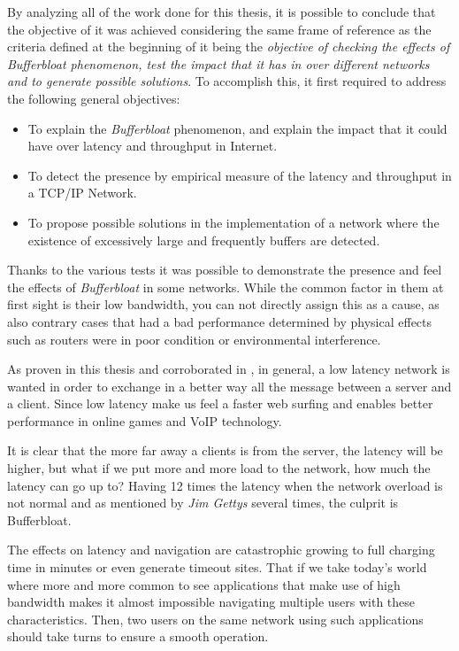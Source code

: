 By analyzing all of the work done for this thesis, it is possible to conclude
that the objective of it was achieved considering the same frame of reference
as the criteria defined at the beginning of it being the \emph{objective of
checking the effects of Bufferbloat phenomenon, test the impact that it has in
over different networks and to generate possible solutions}. To accomplish
this, it first required to address the following general objectives:

\begin{itemize}
	\item To explain the \emph{Bufferbloat} phenomenon, and explain the impact that it could have over latency and throughput in Internet.
	\item To detect the presence by empirical measure of the latency and throughput in a TCP/IP Network.
	\item To propose possible solutions in the implementation of a network where the existence of excessively large and frequently buffers are detected.
\end{itemize}

Thanks to the various tests it was possible to demonstrate the presence and
feel the effects of \emph{Bufferbloat} in some networks. While the common
factor in them at first sight is their low bandwidth, you can not directly
assign this as a cause, as also contrary cases that had a bad performance
determined by physical effects such as routers were in poor condition or
environmental interference.

As proven in this thesis and corroborated in \cite{MathisMacroCAA}, in
general, a low latency network is wanted in order to exchange in a better way
all the message between a server and a client. Since low latency make us feel
a faster web surfing and enables better performance in online games and VoIP
technology.

It is clear that the more far away a clients is from the server, the latency
will be higher, but what if we put more and more load to the network, how much
the latency can go up to? Having 12 times the latency when the network
overload is not normal and as mentioned by \emph{Jim Gettys} several times,
the culprit is Bufferbloat.

The effects on latency and navigation are catastrophic growing to full
charging time in minutes or even generate timeout sites. That if we take
today's world where more and more common to see applications that make use of
high bandwidth makes it almost impossible navigating multiple users with these
characteristics. Then, two users on the same network using such applications
should take turns to ensure a smooth operation.

